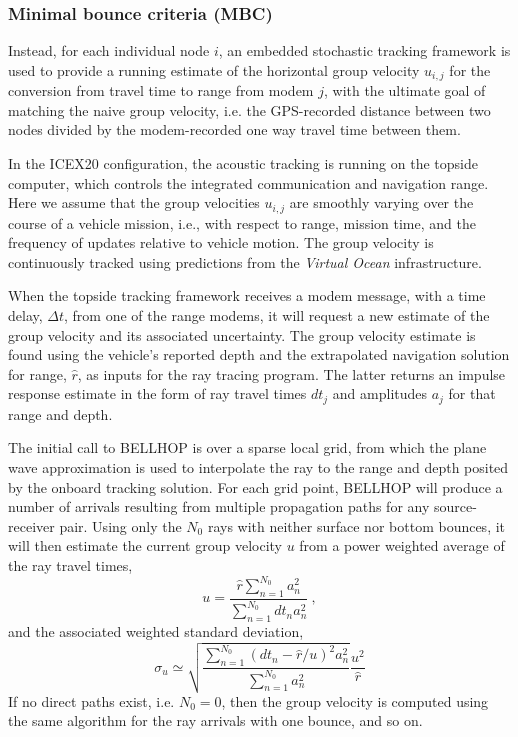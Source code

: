 \subsubsection{Minimal bounce criteria (MBC)}
Instead, for each individual node $i$, an embedded stochastic tracking framework is used to provide a running estimate of the horizontal group velocity $u_{i,j}$ for the conversion from travel time to range from modem $j$, with the ultimate goal of matching the naive group velocity, i.e. the GPS-recorded distance between two nodes divided by the modem-recorded one way travel time between them. 

 In the ICEX20 configuration, the acoustic tracking is running on the topside computer, which controls the integrated communication and navigation range.
Here we assume that the group velocities $u_{i,j}$ are smoothly varying over the course of a vehicle mission, i.e., with respect to range, mission time, and the frequency of updates relative to vehicle motion. 
The group velocity is continuously tracked using predictions from the \textit{Virtual Ocean} infrastructure.

 When the topside tracking framework receives a modem message, with a time delay, $\Delta t$, from one of the range modems, it will request a new estimate of the group velocity and its associated uncertainty.
The group velocity estimate is found using the vehicle's reported depth and the extrapolated navigation solution for range, $\hat{r}$, as inputs for the ray tracing program. The latter returns an impulse response estimate in the form of ray travel times $dt_{j}$ and amplitudes $a_{j}$ for that range and depth.

 The initial call to BELLHOP is over a sparse local grid, from which the plane wave approximation is used to interpolate the ray to the range and depth posited by the onboard tracking solution.
For each grid point, BELLHOP will produce a number of arrivals resulting from multiple propagation paths for any source-receiver pair.
Using only the $N_0$ rays with neither surface nor bottom bounces, it will then estimate the current group velocity $u$ from a power weighted average of the ray travel times,
\begin{equation}
u = \frac{\hat{r} \sum_{n=1}^{N_{0}} a_{n}^{2}}{\sum_{n=1}^{N_{0}} dt_{n}a_{n}^{2}} ~, 
\end{equation}
and the associated weighted standard deviation,
\begin{equation}
\sigma_{u} \simeq \sqrt{\frac {\sum_{n=1}^{N_{0}} (dt_{n}-\hat{r}/u)^{2}a_{n}^{2}}{ \sum_{n=1}^{N_{0}} a_{n}^{2}} } \frac{u^{2}}{\hat{r}}
\end{equation}
If no direct paths exist, i.e. $N_{0}=0$, then the group velocity is computed using the same algorithm for the ray arrivals with one bounce, and so on.

